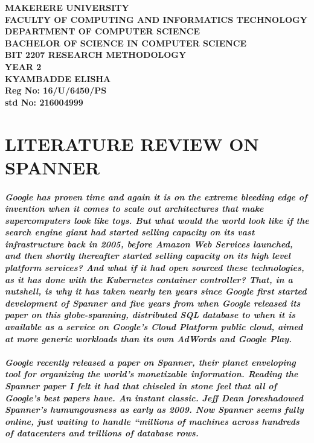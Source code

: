 \documentclass[a4paper,12pt]{article}
\begin{document}
\begin{Huge}
\begin{center}
\begin{normalsize}

\textbf{MAKERERE UNIVERSITY } \\
\textbf{FACULTY OF COMPUTING AND INFORMATICS TECHNOLOGY} \\
\textbf{DEPARTMENT OF COMPUTER SCIENCE} \\
\textbf{BACHELOR OF SCIENCE IN COMPUTER SCIENCE} \\
\textbf{BIT 2207 RESEARCH METHODOLOGY} \\
\textbf{YEAR 2} \\


\textbf{\sc KYAMBADDE ELISHA } \\
\textbf{\sc Reg No: 16/U/6450/PS } \\
\textbf{\sc std No: 216004999}\\
\end{normalsize}
\end{center}
\end{Huge}
\newpage

\section{\sc LITERATURE REVIEW ON SPANNER}
\paragraph{\sl Google has proven time and again it is on the extreme bleeding edge of invention when it comes to scale out architectures that make supercomputers look like toys. But what would the world look like if the search engine giant had started selling capacity on its vast infrastructure back in 2005, before Amazon Web Services launched, and then shortly thereafter started selling capacity on its high level platform services? And what if it had open sourced these technologies, as it has done with the Kubernetes container controller? 
That, in a nutshell, is why it has taken nearly ten years since Google first started development of Spanner and five years from when Google released its paper on this globe-spanning, distributed SQL database to when it is available as a service on Google’s Cloud Platform public cloud, aimed at more generic workloads than its own AdWords and Google Play.}\cite{Timothy}

\paragraph{ \sl Google recently released a paper on Spanner, their planet enveloping tool for organizing the world’s monetizable information. Reading the Spanner paper I felt it had that chiseled in stone feel that all of Google’s best papers have. An instant classic. Jeff Dean foreshadowed Spanner’s humungousness as early as 2009.  Now Spanner seems fully online, just waiting to handle “millions of machines across hundreds of datacenters and trillions of database rows.}\cite{Hoff}
\end{document}
